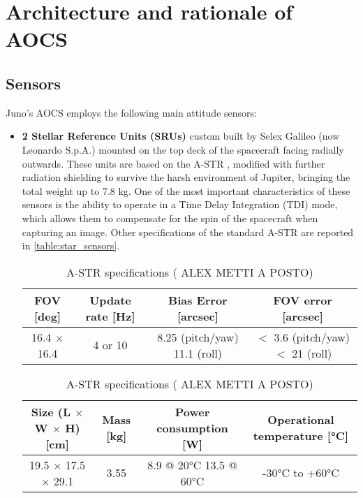 \section{Architecture and rationale of AOCS}
\label{sec:AOCS_architecture_rationale}



\subsection{Sensors}
\label{subsec:Sensors}

Juno's AOCS employs the following main attitude sensors:

\begin{itemize}
    \item \textbf{2 Stellar Reference Units (SRUs)} custom built by Selex Galileo (now Leonardo S.p.A.) mounted on the top deck of the spacecraft facing radially outwards. These units are based on the A-STR \mref, modified with further radiation shielding to survive the harsh environment of Jupiter, bringing the total weight up to 7.8 kg. One of the most important characteristics of these sensors is the ability to operate in a Time Delay Integration (TDI) mode, which allows them to compensate for the spin of the spacecraft when capturing an image. Other specifications of the standard A-STR are reported in \autoref{table:star_sensors}.
    \begin{table}[H]
        \renewcommand{\arraystretch}{1.3}
        \centering
        \begin{tabular}{|c|c|c|c|}
            \hline
            \textbf{FOV [deg]} & \textbf{Update rate [Hz]} & \textbf{Bias Error [arcsec]} & \textbf{FOV error [arcsec]} \\
            \hline
            16.4 $\times$ 16.4 & 4 or 10 & 8.25 (pitch/yaw) 11.1 (roll) & $<$ 3.6 (pitch/yaw) $<$ 21 (roll) \\   
            \hline
        \end{tabular}

        \vspace{5mm}

        \begin{tabular}{|c|c|c|c|}
            \hline
            \textbf{Size (L $\boldsymbol{\times}$ W $\boldsymbol{\times}$ H) [cm]} & \textbf{Mass [kg]} & \textbf{Power consumption [W]} & \textbf{Operational temperature [°C]} \\
            \hline
            19.5 $\times$ 17.5 $\times$ 29.1 & 3.55 & 8.9 @ 20°C 13.5 @ 60°C & -30°C to +60°C\\
            \hline
        \end{tabular}
        \caption{A-STR specifications ( ALEX METTI A POSTO)}
        \label{table:star_sensors}
    \end{table}
 

\end{itemize}
